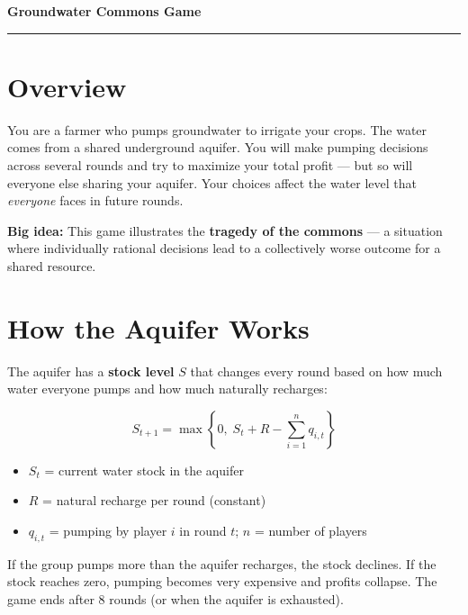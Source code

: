 \documentclass[11pt, letterpaper]{article}
\begin{document}
{\LARGE\bfseries\color{blue} Groundwater Commons Game}\\[-4pt]
\noindent\rule{\linewidth}{1pt}

\vspace{6pt}

\section{Overview}

You are a farmer who pumps groundwater to irrigate your crops. The water comes from a shared underground aquifer. You will make pumping decisions across several rounds and try to maximize your total profit --- but so will everyone else sharing your aquifer. Your choices affect the water level that \emph{everyone} faces in future rounds.

\begin{infobox}
\textbf{Big idea:} This game illustrates the \textbf{tragedy of the commons} --- a situation where individually rational decisions lead to a collectively worse outcome for a shared resource.
\end{infobox}

\section{How the Aquifer Works}

The aquifer has a \textbf{stock level} $S$ that changes every round based on how much water everyone pumps and how much naturally recharges:

\begin{infobox}
\[
S_{t+1} = \max\!\left\{0,\; S_t + R - \textstyle\sum_{i=1}^{n} q_{i,t}\right\}
\]
\vspace{-6pt}
\begin{itemize}
  \item $S_t$ = current water stock in the aquifer
  \item $R$ = natural recharge per round (constant)
  \item $q_{i,t}$ = pumping by player $i$ in round $t$; \;$n$ = number of players
\end{itemize}
\end{infobox}

If the group pumps more than the aquifer recharges, the stock declines. If the stock reaches zero, pumping becomes very expensive and profits collapse. The game ends after 8 rounds (or when the aquifer is exhausted).
\end{document}
